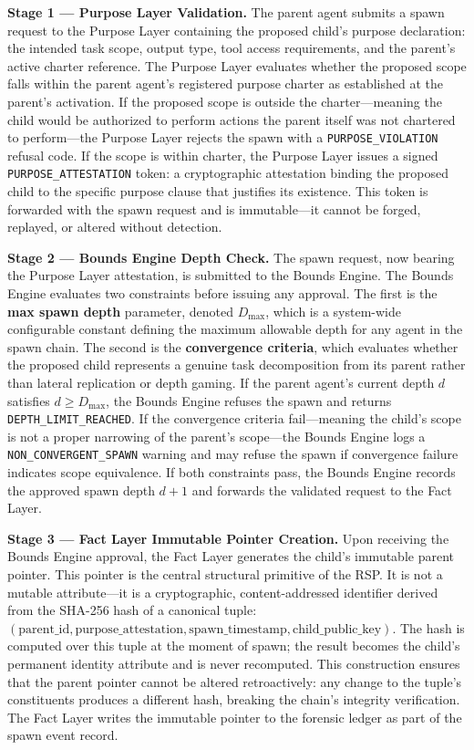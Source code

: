 \textbf{Stage 1 — Purpose Layer Validation.} The parent agent submits a spawn request to the Purpose Layer containing the proposed child's purpose declaration: the intended task scope, output type, tool access requirements, and the parent's active charter reference. The Purpose Layer evaluates whether the proposed scope falls within the parent agent's registered purpose charter as established at the parent's activation. If the proposed scope is outside the charter—meaning the child would be authorized to perform actions the parent itself was not chartered to perform—the Purpose Layer rejects the spawn with a \texttt{PURPOSE\_VIOLATION} refusal code. If the scope is within charter, the Purpose Layer issues a signed \texttt{PURPOSE\_ATTESTATION} token: a cryptographic attestation binding the proposed child to the specific purpose clause that justifies its existence. This token is forwarded with the spawn request and is immutable—it cannot be forged, replayed, or altered without detection.

\textbf{Stage 2 — Bounds Engine Depth Check.} The spawn request, now bearing the Purpose Layer attestation, is submitted to the Bounds Engine. The Bounds Engine evaluates two constraints before issuing any approval. The first is the \textbf{max spawn depth} parameter, denoted $D_{\max}$, which is a system-wide configurable constant defining the maximum allowable depth for any agent in the spawn chain. The second is the \textbf{convergence criteria}, which evaluates whether the proposed child represents a genuine task decomposition from its parent rather than lateral replication or depth gaming. If the parent agent's current depth $d$ satisfies $d \geq D_{\max}$, the Bounds Engine refuses the spawn and returns \texttt{DEPTH\_LIMIT\_REACHED}. If the convergence criteria fail—meaning the child's scope is not a proper narrowing of the parent's scope—the Bounds Engine logs a \texttt{NON\_CONVERGENT\_SPAWN} warning and may refuse the spawn if convergence failure indicates scope equivalence. If both constraints pass, the Bounds Engine records the approved spawn depth $d+1$ and forwards the validated request to the Fact Layer.

\textbf{Stage 3 — Fact Layer Immutable Pointer Creation.} Upon receiving the Bounds Engine approval, the Fact Layer generates the child's immutable parent pointer. This pointer is the central structural primitive of the RSP. It is not a mutable attribute—it is a cryptographic, content-addressed identifier derived from the SHA-256 hash of a canonical tuple: $(\text{parent\_id}, \text{purpose\_attestation}, \text{spawn\_timestamp}, \text{child\_public\_key})$. The hash is computed over this tuple at the moment of spawn; the result becomes the child's permanent identity attribute and is never recomputed. This construction ensures that the parent pointer cannot be altered retroactively: any change to the tuple's constituents produces a different hash, breaking the chain's integrity verification. The Fact Layer writes the immutable pointer to the forensic ledger as part of the spawn event record.

